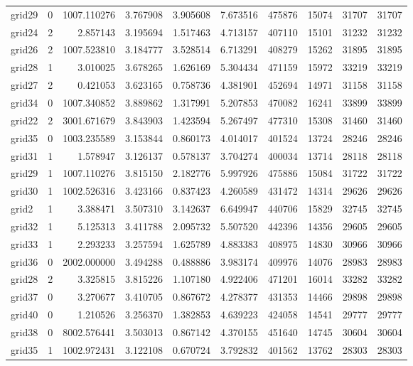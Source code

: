 \documentclass[../../../thesis.tex]{subfiles}
\begin{document}
\begin{longtable}{|l|r|r|r|r|r|r|r|r|r|}
grid29 & 0 & 1007.110276 & 3.767908 & 3.905608 & 7.673516 & 475876 & 15074 & 31707 & 31707 \\
grid24 & 2 & 2.857143 & 3.195694 & 1.517463 & 4.713157 & 407110 & 15101 & 31232 & 31232 \\
grid26 & 2 & 1007.523810 & 3.184777 & 3.528514 & 6.713291 & 408279 & 15262 & 31895 & 31895 \\
grid28 & 1 & 3.010025 & 3.678265 & 1.626169 & 5.304434 & 471159 & 15972 & 33219 & 33219 \\
grid27 & 2 & 0.421053 & 3.623165 & 0.758736 & 4.381901 & 452694 & 14971 & 31158 & 31158 \\
grid34 & 0 & 1007.340852 & 3.889862 & 1.317991 & 5.207853 & 470082 & 16241 & 33899 & 33899 \\
grid22 & 2 & 3001.671679 & 3.843903 & 1.423594 & 5.267497 & 477310 & 15308 & 31460 & 31460 \\
grid35 & 0 & 1003.235589 & 3.153844 & 0.860173 & 4.014017 & 401524 & 13724 & 28246 & 28246 \\
grid31 & 1 & 1.578947 & 3.126137 & 0.578137 & 3.704274 & 400034 & 13714 & 28118 & 28118 \\
grid29 & 1 & 1007.110276 & 3.815150 & 2.182776 & 5.997926 & 475886 & 15084 & 31722 & 31722 \\
grid30 & 1 & 1002.526316 & 3.423166 & 0.837423 & 4.260589 & 431472 & 14314 & 29626 & 29626 \\
grid2 & 1 & 3.388471 & 3.507310 & 3.142637 & 6.649947 & 440706 & 15829 & 32745 & 32745 \\
grid32 & 1 & 5.125313 & 3.411788 & 2.095732 & 5.507520 & 442396 & 14356 & 29605 & 29605 \\
grid33 & 1 & 2.293233 & 3.257594 & 1.625789 & 4.883383 & 408975 & 14830 & 30966 & 30966 \\
grid36 & 0 & 2002.000000 & 3.494288 & 0.488886 & 3.983174 & 409976 & 14076 & 28983 & 28983 \\
grid28 & 2 & 3.325815 & 3.815226 & 1.107180 & 4.922406 & 471201 & 16014 & 33282 & 33282 \\
grid37 & 0 & 3.270677 & 3.410705 & 0.867672 & 4.278377 & 431353 & 14466 & 29898 & 29898 \\
grid40 & 0 & 1.210526 & 3.256370 & 1.382853 & 4.639223 & 424058 & 14541 & 29777 & 29777 \\
grid38 & 0 & 8002.576441 & 3.503013 & 0.867142 & 4.370155 & 451640 & 14745 & 30604 & 30604 \\
grid35 & 1 & 1002.972431 & 3.122108 & 0.670724 & 3.792832 & 401562 & 13762 & 28303 & 28303 \\

\end{longtable}
\end{document}
